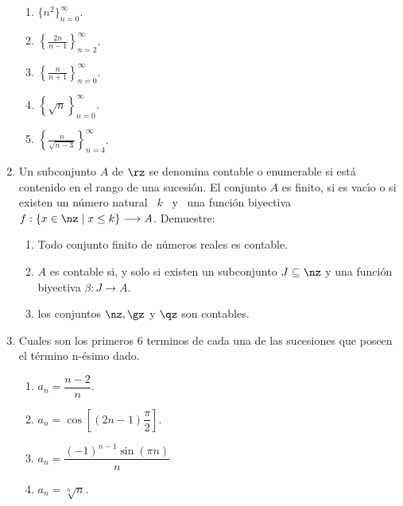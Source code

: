 \begin{enumerate}
\begin{enumerate}
\item $\{n^{2}\}_{n=0}^{\infty}$.

\item $\left\{  \frac{2n}{n-1}\right\}  _{n=2}^{\infty}$.

\item $\left\{  \frac{n}{n+1}\right\}  _{n=0}^{\infty}$.

\item $\left\{  \sqrt{n}\right\}  _{n=0}^{\infty}$.

\item $\left\{  \frac{n}{\sqrt{n-3}}\right\}  _{n=4}^{\infty}$.
\end{enumerate}

\item Un subconjunto $A$ de $\rz$ se denomina
%
contable o
%
enumerable si est\'{a} contenido en el rango de una sucesi\'{o}n. El conjunto
$A$ es finito, si es vac\'{\i}o o si existen un n\'{u}mero natural \ $k$ \ y
\ una funci\'{o}n biyectiva $f:\{x\in\nz\mid x\leq k\}\longrightarrow A$. Demuestre:

\begin{enumerate}
\item Todo conjunto finito de n\'{u}meros reales es contable.

\item $A$ es contable si, y solo si existen un subconjunto $J\subseteq\nz$ y
una funci\'{o}n biyectiva $\beta:J\longrightarrow A$.

\item los conjuntos $\nz,\gz$ y $\qz$ son contables.
\end{enumerate}

\item Cuales son los primeros $6$ terminos de cada una de las sucesiones que
poseen el t\'{e}rmino n-\'{e}simo dado.

\begin{enumerate}
\item $a_{n}=\dfrac{n-2}{n}.$

\item $a_{n}=\cos\left[  \left(  2n-1\right)  \dfrac{\pi}{2}\right]  .$

\item $a_{n}=\dfrac{\left(  -1\right)  ^{n-1}\sin\left(  \pi n\right)  }{n}$

\item $a_{n}=\sqrt[n]{n}.$


\end{enumerate}
\end{enumerate}

